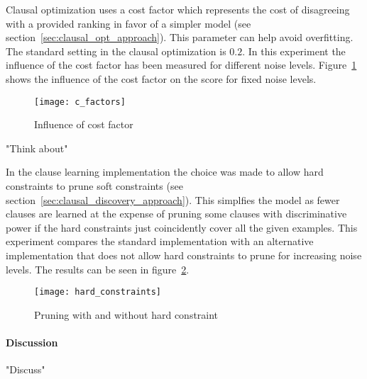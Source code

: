 \begin{experiment}
	
	Clausal optimization uses a cost factor which represents the cost of disagreeing with a provided ranking in favor of a simpler model (see section~\ref{sec:clausal_opt_approach}).
	This parameter can help avoid overfitting.
	The standard setting in the clausal optimization is $0.2$.
	In this experiment the influence of the cost factor has been measured for different noise levels.
	Figure~\ref{fig:c_factors} shows the influence of the cost factor on the score for fixed noise levels.

	\begin{figure}

		\caption{Influence of cost factor}
		\centering
			\texttt{[image: c\_factors]}
		\label{fig:c_factors}

	\end{figure}

\end{experiment}

\begin{experiment}
	"Think about"
\end{experiment}

\begin{experiment}
	
	In the clause learning implementation the choice was made to allow hard constraints to prune soft constraints (see section~\ref{sec:clausal_discovery_approach}).
	This simplfies the model as fewer clauses are learned at the expense of pruning some clauses with discriminative power if the hard constraints just coincidently cover all the given examples.
	This experiment compares the standard implementation with an alternative implementation that does not allow hard constraints to prune for increasing noise levels.
	The results can be seen in figure~\ref{fig:hard_constraints}.

	\begin{figure}

		\caption{Pruning with and without hard constraint}
		\centering
			\texttt{[image: hard\_constraints]}
		\label{fig:hard_constraints}

	\end{figure}

\end{experiment}

\paragraph{Discussion}
"Discuss"